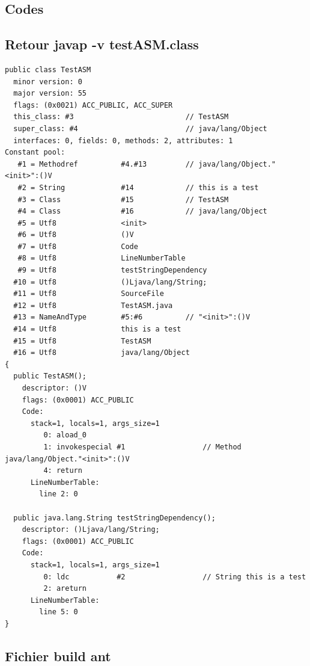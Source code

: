\documentclass[french,a4paper,12pt]{report}
\begin{document}
\begin{appendices}
    
\chapter*{Codes}

\section*{Retour javap -v testASM.class}
\label{javapVtestASM}

\begin{lstlisting}
public class TestASM
  minor version: 0
  major version: 55
  flags: (0x0021) ACC_PUBLIC, ACC_SUPER
  this_class: #3                          // TestASM
  super_class: #4                         // java/lang/Object
  interfaces: 0, fields: 0, methods: 2, attributes: 1
Constant pool:
   #1 = Methodref          #4.#13         // java/lang/Object."<init>":()V
   #2 = String             #14            // this is a test
   #3 = Class              #15            // TestASM
   #4 = Class              #16            // java/lang/Object
   #5 = Utf8               <init>
   #6 = Utf8               ()V
   #7 = Utf8               Code
   #8 = Utf8               LineNumberTable
   #9 = Utf8               testStringDependency
  #10 = Utf8               ()Ljava/lang/String;
  #11 = Utf8               SourceFile
  #12 = Utf8               TestASM.java
  #13 = NameAndType        #5:#6          // "<init>":()V
  #14 = Utf8               this is a test
  #15 = Utf8               TestASM
  #16 = Utf8               java/lang/Object
{
  public TestASM();
    descriptor: ()V
    flags: (0x0001) ACC_PUBLIC
    Code:
      stack=1, locals=1, args_size=1
         0: aload_0
         1: invokespecial #1                  // Method java/lang/Object."<init>":()V
         4: return
      LineNumberTable:
        line 2: 0

  public java.lang.String testStringDependency();
    descriptor: ()Ljava/lang/String;
    flags: (0x0001) ACC_PUBLIC
    Code:
      stack=1, locals=1, args_size=1
         0: ldc           #2                  // String this is a test
         2: areturn
      LineNumberTable:
        line 5: 0
}
\end{lstlisting}
 
\section*{Fichier build ant}
\label{antBuild}

    

\end{appendices}
\end{document}
